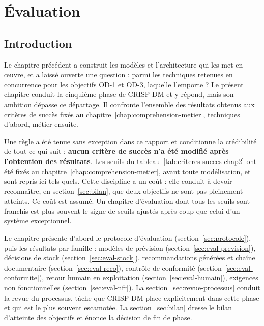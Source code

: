 %

\chapter{Évaluation}
\label{chap:evaluation}
\minitocsection
\newpage

\section*{Introduction}

Le chapitre précédent a construit les modèles et l'architecture qui les met en œuvre, et a laissé ouverte une question : parmi les techniques retenues en concurrence pour les objectifs OD-1 et OD-3, laquelle l'emporte ? Le présent chapitre conduit la cinquième phase de CRISP-DM et y répond, mais son ambition dépasse ce départage. Il confronte l'ensemble des résultats obtenus aux critères de succès fixés au chapitre~\ref{chap:comprehension-metier}, techniques d'abord, métier ensuite.

Une règle a été tenue sans exception dans ce rapport et conditionne la crédibilité de tout ce qui suit : \textbf{aucun critère de succès n'a été modifié après l'obtention des résultats}. Les seuils du tableau~\ref{tab:criteres-succes-chap2} ont été fixés au chapitre~\ref{chap:comprehension-metier}, avant toute modélisation, et sont repris ici tels quels. Cette discipline a un coût : elle conduit à devoir reconnaître, en section~\ref{sec:bilan}, que deux objectifs ne sont pas pleinement atteints. Ce coût est assumé. Un chapitre d'évaluation dont tous les seuils sont franchis est plus souvent le signe de seuils ajustés après coup que celui d'un système exceptionnel.

Le chapitre présente d'abord le protocole d'évaluation (section~\ref{sec:protocole}), puis les résultats par famille : modèles de prévision (section~\ref{sec:eval-prevision}), décisions de stock (section~\ref{sec:eval-stock}), recommandations générées et chaîne documentaire (section~\ref{sec:eval-reco}), contrôle de conformité (section~\ref{sec:eval-conformite}), retour humain en exploitation (section~\ref{sec:eval-humain}), exigences non fonctionnelles (section~\ref{sec:eval-nfr}). La section~\ref{sec:revue-processus} conduit la revue du processus, tâche que CRISP-DM place explicitement dans cette phase et qui est le plus souvent escamotée. La section~\ref{sec:bilan} dresse le bilan d'atteinte des objectifs et énonce la décision de fin de phase.

